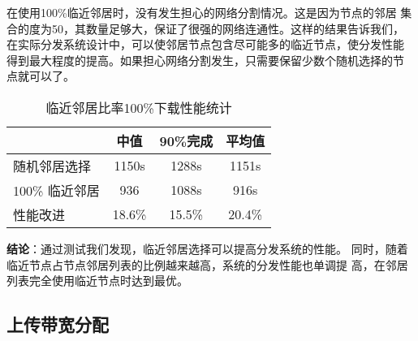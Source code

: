 在使用100\%临近邻居时，没有发生担心的网络分割情况。这是因为节点的邻居
集合的度为50，其数量足够大，保证了很强的网络连通性。这样的结果告诉我们，
在实际分发系统设计中，可以使邻居节点包含尽可能多的临近节点，使分发性能
得到最大程度的提高。如果担心网络分割发生，只需要保留少数个随机选择的节
点就可以了。

\begin{table}[htbp]
\centering
\begin{minipage}{0.8\linewidth}
\centering
\caption{临近邻居比率100\%下载性能统计}
\label{tbl:bias10}
\begin{tabular}{lccc}

\toprule[1.5pt]
              & 中值 & 90\%完成 & 平均值\\
\midrule[1pt]
随机邻居选择  & 1150s & 1288s & 1151s\\
100\% 临近邻居 & 936 & 1088s & 916s\\
性能改进      & 18.6\% & 15.5\% & 20.4\%\\
\bottomrule[1.5pt]
\end{tabular}
\end{minipage}
\end{table}



%

\textbf{结论}：通过测试我们发现，临近邻居选择可以提高分发系统的性能。
同时，随着临近节点占节点邻居列表的比例越来越高，系统的分发性能也单调提
高，在邻居列表完全使用临近节点时达到最优。



\subsection{上传带宽分配}


